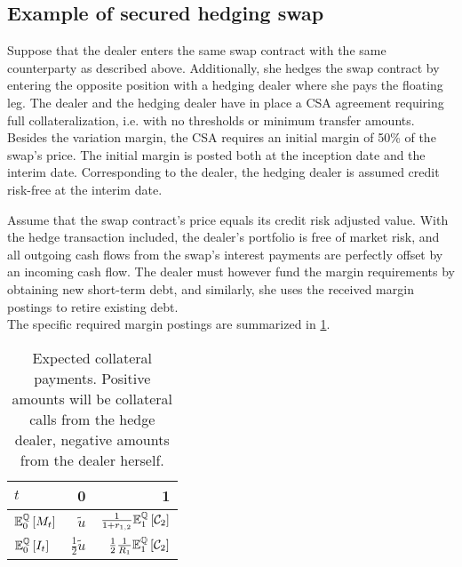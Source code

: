 \documentclass[main.tex]{subfiles}
\begin{document}
    \subsection{Example of secured hedging swap}
        Suppose that the dealer enters the same swap contract with the same counterparty as described above.
        Additionally, she hedges the swap contract by entering the opposite position with a hedging dealer
        where she pays the floating leg.
        The dealer and the hedging dealer have in place a CSA agreement 
        requiring full collateralization, i.e. with no thresholds or minimum transfer amounts.
        Besides the variation margin,
        the CSA requires an initial margin of 50\% of the swap's price.
        The initial margin is posted both at the inception date and the interim date.
        Corresponding to the dealer, the hedging dealer is assumed credit risk-free at the interim date.

        Assume that the swap contract's price equals its credit risk adjusted value.
        With the hedge transaction included,
        the dealer's portfolio is free of market risk,
        and all outgoing cash flows from the swap's interest payments
        are perfectly offset by an incoming cash flow.
        The dealer must however fund the margin requirements by obtaining new short-term debt,
        and similarly, she uses the received margin postings to retire existing debt.
        \\
        The specific required margin postings are summarized in \cref{tbl:swap-margin-postings}.

        \begin{table}[H]
            \centering
            \begin{tabular}{l|rr}
                $t$ & 0 & 1 \\
                \hline
                \rule{0pt}{1.3em}
                $\mathbb{E}_{0}^{\mathbb{Q}}\left[M_t\right]$ & $\tilde{u}$ & $\frac{1}{1+r_{1,2}}\mathbb{E}_{1}^{\mathbb{Q}}\left[\mathcal{C}_{2}\right]$ \\
                \rule{0pt}{1.3em}
                $\mathbb{E}_{0}^{\mathbb{Q}}\left[I_t\right]$ & $\frac{1}{2}\tilde{u}$ & $\frac{1}{2}\frac{1}{R_1}\mathbb{E}_{1}^{\mathbb{Q}}\left[\mathcal{C}_{2}\right]$ \\
            \end{tabular}
            \caption{
                Expected collateral payments. 
                Positive amounts will be collateral calls from the hedge dealer,
                negative amounts from the dealer herself.
            }
            \label{tbl:swap-margin-postings}
        \end{table}
\end{document}
